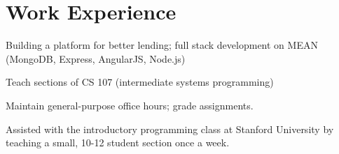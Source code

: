 \documentclass[letterpaper]{deedy-resume} %
\begin{document}
%
\begin{minipage}[t]{0.66\textwidth} %


\section{Work Experience}


\vspace{\topsep} %
\begin{tightitemize}
\item Building a platform for better lending; full stack development on MEAN (MongoDB, Express, AngularJS, Node.js)
\end{tightitemize}

\sectionspace %

\begin{tightitemize}
\item Teach sections of CS 107 (intermediate systems programming)
\item Maintain general-purpose office hours; grade assignments.
\end{tightitemize}

\sectionspace %

\begin{tightitemize}
\item Assisted with the introductory programming class at Stanford University by teaching a small, 10-12 student section once a week.
\end{tightitemize}

\sectionspace %


\end{minipage}
\end{document}
